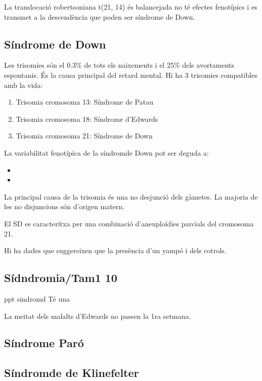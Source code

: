 La translocació robertsoniana t(21, 14) és balancejada no té efectes
fenotípics i es transmet a la descendència que poden ser síndrome de
Down.

\subsection{Síndrome de Down}
\label{sec:sindrome-de-down}

Les trisomies són el 0.3\% de tots els naixements i el 25\% dels
avortaments espontanis. És la causa principal del retard mental. Hi ha
3 trisomies compatibles amb la vida:
\begin{enumerate}
\item Trisomia cromosoma 13:  Síndrome de Patau
\item Trisomia cromosoma 18: Síndrome d'Edwards
\item Trisomia cromosoma 21: Síndrome de Down
\end{enumerate}

La variabilitat fenotípica de la síndromde Down pot ser deguda a:
\begin{itemize}
\item 
\item  %
\end{itemize}

La principal causa de la trisomia és una no desjunció dels gàmetes. La
majoria de les no disjuncions són d'origen matern.

El SD es caracteritxa per una combinació d'aneuploïdies parcials del
cromosoma 21.

Hi ha dades que suggereixen que la presència d'un yampó i dels
cotrols.

\subsection{Sídndromia/Tam1 10}
\label{sec:sidndromiatam1-10}


ppt sindromd Té una


La meitat dels malalts d'Edwards no passen la 1ra setmana.


\subsection{Síndrome Paró}
\label{sec:sindrome-paro}


\subsection{Síndromde de Klinefelter}
\label{sec:sindr-de-klin}

